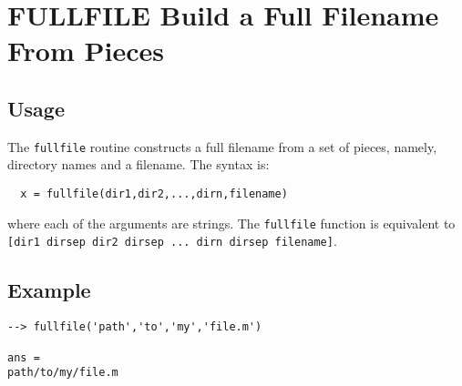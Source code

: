 \section{FULLFILE Build a Full Filename From Pieces}

\subsection{Usage}

The \verb|fullfile| routine constructs a full filename from a set of
pieces, namely, directory names and a filename.  The syntax is:
\begin{verbatim}
  x = fullfile(dir1,dir2,...,dirn,filename)
\end{verbatim}
where each of the arguments are strings.  The \verb|fullfile| function
is equivalent to \verb|[dir1 dirsep dir2 dirsep ... dirn dirsep filename]|.
\subsection{Example}

\begin{verbatim}
--> fullfile('path','to','my','file.m')

ans = 
path/to/my/file.m
\end{verbatim}

